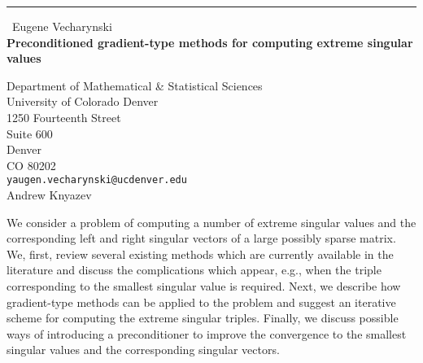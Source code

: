 \documentclass{report}
\begin{document}
\begin{center}
\rule{6in}{1pt} \
{\large Eugene Vecharynski \\
{\bf Preconditioned gradient-type methods for computing extreme singular values}}

Department of Mathematical & Statistical Sciences \\ University of Colorado Denver \\ 1250 Fourteenth Street \\ Suite 600 \\ Denver \\ CO 80202
\\
{\tt yaugen.vecharynski@ucdenver.edu}\\
Andrew Knyazev\end{center}

We consider a problem of computing a number of extreme singular values
and the corresponding left and right singular vectors of
a large possibly sparse matrix. We, first, review several existing
methods which are currently available in the literature
and discuss the complications which appear, e.g., when the triple
corresponding to the smallest singular value is required. Next, we
describe how gradient-type methods can be applied to the problem and
suggest an iterative scheme for computing the extreme singular triples.
Finally, we discuss possible ways of introducing a preconditioner to
improve the convergence to the smallest singular values and the
corresponding singular vectors.
\end{document}
